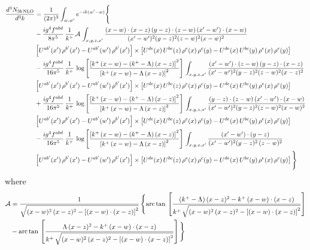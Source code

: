 \documentclass[9pt]{article}
\numberwithin{equation}{section}
\begin{document}
\begin{align}
\frac{d^{3}N_{3b\,\rm NLO}}{d^{3}k} & =\frac{1}{(2\pi)^{3}}\int_{w,w'}e^{-ik(w'-w)}\Bigg\{\notag \\ &-\frac{ig^{4}f^{abd}}{8\pi^{5}}\,\frac{1}{k^{+}}\,\mathcal{A}\,\int_{x,y,z,x'}
\frac{(x-w)\cdot(x-z)\,(y-z)\cdot(z-w)\,(x'-w')\cdot(x-w)}{(x'-w')^{2}(y-z)^{2}(z-w)^{2}(x-w)^{2}}\notag \\ & \left[U^{ab'}(x')\,\rho^{b'}(x')-U^{ab'}(w')\, \rho^{b'}(x')\right]\times \left[U^{de}(x)\,U^{bc}(z)\, \rho^{e}(x)\,\rho^{c}(y)-U^{de}(x)\,U^{bc}(y)\,\rho^{e}(x)\,\rho^{c}(y)\right]\notag \\ & -\frac{ig^{4}f^{abd}}{16\pi^{5}}\,\frac{1}{k^{+}}\,\log{\left[\frac{\left[k^{+}\,(x-w)-(k^{+}-\Lambda)\,(x-z)\right]^{2}}{\left[k^{+}\,(x-w)-\Lambda\,(x-z)\right]^{2}}\right]}\,\int_{x,y,z,x'}
\frac{(x'-w')\cdot(z-w)\,(y-z)\cdot(x-z)}{(x'-w')^{2}(y-z)^{2}(z-w)^{2}(x-z)^{2}}\notag \\
&\left[U^{ab'}(x')\,\rho^{b'}(x')-U^{ab'}(w')\, \rho^{b'}(x')\right]\times \left[U^{de}(x)\,U^{bc}(z)\, \rho^{e}(x)\,\rho^{c}(y)-U^{de}(x)\,U^{bc}(y)\,\rho^{e}(x)\,\rho^{c}(y)\right]\notag \\ &+ \frac{ig^{4}f^{abd}}{16\pi^{5}}\,\frac{1}{k^{+}}\,\log{\left[\frac{\left[k^{+}\,(x-w)-(k^{+}-\Lambda)\,(x-z)\right]^{2}}{\left[k^{+}\,(x-w)-\Lambda\,(x-z)\right]^{2}}\right]}\,\int_{x,y,z,x'}
\frac{(y-z)\cdot(z-w)\,(x'-w')\cdot(x-w)}{(x'-w')^{2}(y-z)^{2}(z-w)^{2}(x-w)^{2}}\notag \\ 
& \left[U^{ab'}(x')\,\rho^{b'}(x')-U^{ab'}(w')\, \rho^{b'}(x')\right]\times \left[U^{de}(x)\,U^{bc}(z)\, \rho^{e}(x)\,\rho^{c}(y)-U^{de}(x)\,U^{bc}(y)\,\rho^{e}(x)\,\rho^{c}(y)\right]\notag \\ & -\frac{ig^{4}f^{abd}}{16\pi^{5}}\,\frac{1}{k^{+}}\,\log{\left[\frac{\left[k^{+}\,(x-w)-(k^{+}-\Lambda)\,(x-z)\right]^{2}}{\left[k^{+}\,(x-w)-\Lambda\,(x-z)\right]^{2}}\right]}\,\int_{x,y,z,x'}
\frac{(x'-w')\cdot(y-z)}{(x'-w')^{2}(y-z)^{2}\,(z-w)^{2}}\notag \\ & \left[U^{ab'}(x')\,\rho^{b'}(x')-U^{ab'}(w')\, \rho^{b'}(x')\right]\times \left[U^{de}(x)\,U^{bc}(z)\, \rho^{e}(x)\,\rho^{c}(y)-U^{de}(x)\,U^{bc}(y)\,\rho^{e}(x)\,\rho^{c}(y)\right]\Bigg\}
\end{align}
where 
\begin{align}
\mathcal{A} & = \frac{1}{\sqrt{(x-w)^{2}\,(x-z)^{2}-\left[(x-w)\cdot (x-z)\right]^{2}}}\, \Bigg\{\mathrm{arc\,tan}\,\left[\frac{(k^{+}-\Lambda)\,(x-z)^{2}-k^{+}\,(x-w)\cdot (x-z)}{k^{+}\,\sqrt{(x-w)^{2}\,(x-z)^{2}-\left[(x-w)\cdot (x-z)\right]^{2}}}\right]\notag \\ & - \mathrm{arc\,tan}\,\left[\frac{\Lambda\,(x-z)^{2}-k^{+}\,(x-w)\cdot (x-z)}{k^{+}\,\sqrt{(x-w)^{2}\,(x-z)^{2}-\left[(x-w)\cdot (x-z)\right]^{2}}}\right] \Bigg\} \nonumber
\end{align}
\end{document}
